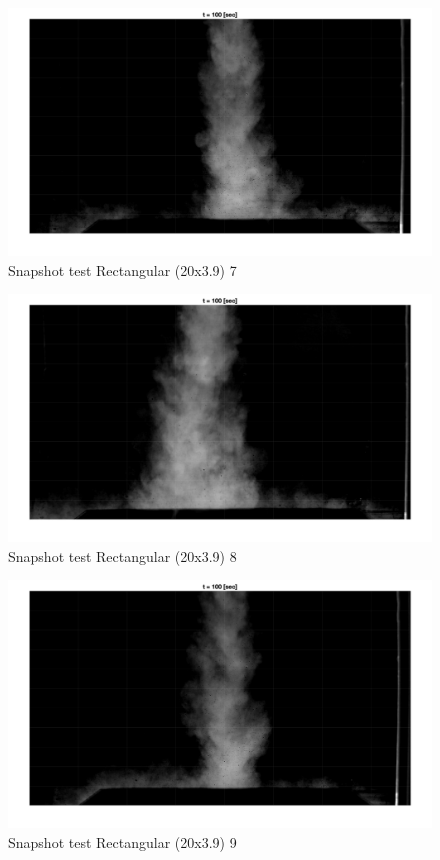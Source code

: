 \begin{figure}[ht!]
    \centering
    \includegraphics[width=\linewidth]{Images/Rec20_7_t100.jpg}
    \caption{Snapshot test Rectangular (20x3.9) 7}
\end{figure}

\begin{figure}[ht!]
    \centering
    \includegraphics[width=\linewidth]{Images/Rec20_8_t100.jpg}
    \caption{Snapshot test Rectangular (20x3.9) 8}
\end{figure}

\begin{figure}[ht!]
    \centering
    \includegraphics[width=\linewidth]{Images/Rec20_9_t100.jpg}
    \caption{Snapshot test Rectangular (20x3.9) 9}
\end{figure}

